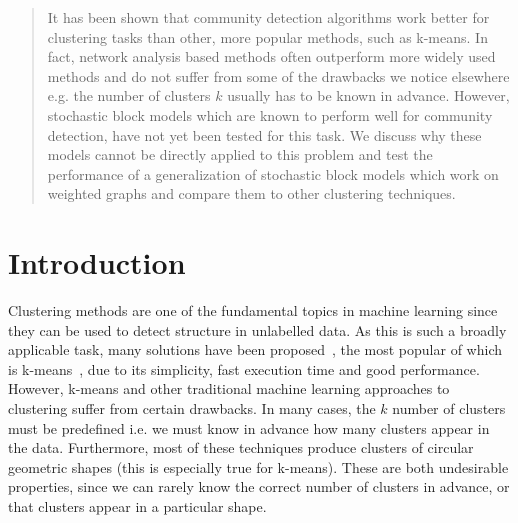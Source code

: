 \documentclass[conference]{IEEEtran}
\begin{document}
\begin{abstract}
It has been shown that community detection algorithms work better for clustering tasks than other, more popular methods, such as k-means. In fact, network analysis based methods often outperform more widely used methods and do not suffer from some of the drawbacks we notice elsewhere e.g. the number of clusters $k$ usually has to be known in advance. However, stochastic block models which are known to perform well for community detection, have not yet been tested for this task. We discuss why these models cannot be directly applied to this problem and test the performance of a generalization of stochastic block models which work on weighted graphs and compare them to other clustering techniques.
\end{abstract}







%
\IEEEpeerreviewmaketitle

\section{Introduction}
Clustering methods are one of the fundamental topics in machine learning since they can be used to detect structure in unlabelled data. As this is such a broadly applicable task, many solutions have been proposed~\cite{theodoridis2003pattern}, the most popular of which is k-means~\cite{macqueen1967some}, due to its simplicity, fast execution time and good performance. However, k-means and other traditional machine learning approaches to clustering suffer from certain drawbacks. In many cases, the $k$ number of clusters must be predefined i.e. we must know in advance how many clusters appear in the data. Furthermore, most of these techniques produce clusters of circular geometric shapes (this is especially true for k-means). These are both undesirable properties, since we can rarely know the correct number of clusters in advance, or that clusters appear in a particular shape.
\end{document}
